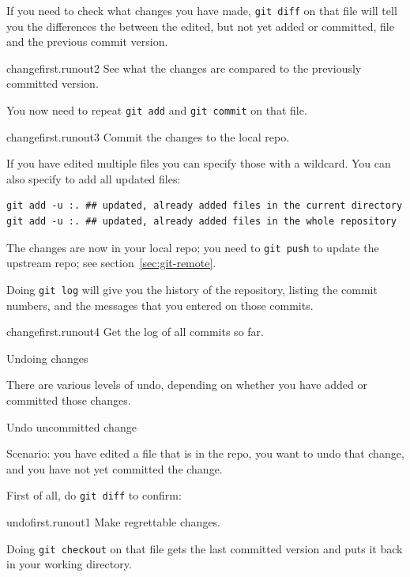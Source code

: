 If you need to check what changes you have made, \lstinline{git diff} on that file
will tell you the differences the between the edited, but not yet added or committed,
file and the previous commit version.

\begin{gitstep}{changefirst.runout2}
  See what the changes are compared to the previously committed version.
\end{gitstep}

You now need to repeat \lstinline{git add} and \lstinline{git commit} on that file.

\begin{gitstep}{changefirst.runout3}
  Commit the changes to the local repo.
\end{gitstep}

If you have edited multiple files you can specify those with a wildcard.
You can also specify to add all updated files:
\begin{lstlisting}
git add -u :. ## updated, already added files in the current directory
git add -u :. ## updated, already added files in the whole repository
\end{lstlisting}

The changes are now in your local repo;
you need to \lstinline{git push} to update the upstream repo;
see section~\ref{sec:git-remote}.

Doing \lstinline{git log} will give you the history of the repository,
listing the commit numbers, and the messages that you entered on those commits.

\begin{gitstep}{changefirst.runout4}
  Get the log of all commits so far.
\end{gitstep}

\newpage
{} {Undoing changes}

There are various levels of undo, depending on whether you have added or committed
those changes.

 {Undo uncommitted change}

Scenario: you have edited a file that is in the repo,
you want to undo that change,
and you have not yet committed the change.

First of all, do \lstinline{git diff} to confirm:

\begin{gitstep}{undofirst.runout1}
  Make regrettable changes.
\end{gitstep}

Doing \lstinline{git checkout} on that file gets the last committed version
and puts it back in your working directory.


